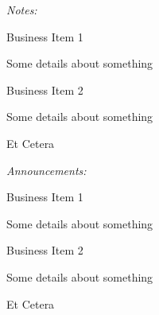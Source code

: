 \documentclass[10pt,a4paper,twoside]{mins}
\begin{document}
\begin{minutes}

    \begin{center}
        \emph{Notes:}
    \end{center}
    
    \begin{notes}
        \item Business Item 1

        Some details about something

        \item Business Item 2

        Some details about something

        \item Et Cetera

    \end{notes}

    \begin{center}
        \emph{Announcements:}
    \end{center}

    \begin{notes}
        \item Business Item 1
    
        Some details about something
    
        \item Business Item 2
    
        Some details about something
    
        \item Et Cetera
    
    \end{notes}

\end{minutes}

\bigskip
\bigskip
{}
\end{document}
